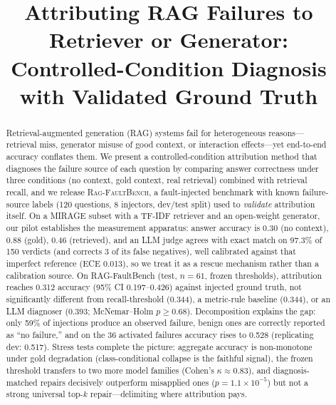 \documentclass[conference]{IEEEtran}
\begin{document}
\title{Attributing RAG Failures to Retriever or Generator:\\
Controlled-Condition Diagnosis with Validated Ground Truth}

\author{
}

\maketitle

\begin{abstract}
Retrieval-augmented generation (RAG) systems fail for heterogeneous
reasons---retrieval miss, generator misuse of good context, or interaction
effects---yet end-to-end accuracy conflates them. We present a
controlled-condition attribution method that diagnoses the failure source of
each question by comparing answer correctness under three conditions (no
context, gold context, real retrieval) combined with retrieval recall, and we
release \textsc{Rag-FaultBench}, a fault-injected benchmark with known
failure-source labels (120 questions, 8 injectors, dev/test split) used to
\emph{validate} attribution itself. On a MIRAGE subset with a TF-IDF retriever
and an open-weight generator, our pilot establishes the measurement apparatus:
answer accuracy is 0.30 (no context), 0.88 (gold), 0.46 (retrieved), and an
LLM judge agrees with exact match on 97.3\% of 150 verdicts (and corrects 3
of its false negatives), well calibrated against that imperfect reference
(ECE 0.013), so we treat it as a rescue mechanism rather than a
calibration source.
On RAG-FaultBench (test, $n{=}61$, frozen thresholds), attribution reaches
0.312 accuracy (95\% CI 0.197--0.426) against injected ground truth, not
significantly different from recall-threshold (0.344), a metric-rule
baseline (0.344), or an LLM diagnoser (0.393; McNemar--Holm $p\ge0.68$).
Decomposition explains the gap: only 59\% of injections produce an
observed failure, benign ones are correctly reported as ``no failure,''
and on the 36 activated failures accuracy rises to 0.528 (replicating dev:
0.517). Stress tests complete the picture: aggregate accuracy is
non-monotone under gold degradation (class-conditional collapse is the
faithful signal), the frozen threshold transfers to two more model
families (Cohen's $\kappa{\approx}0.83$), and diagnosis-matched repairs
decisively outperform misapplied ones ($p{=}1.1{\times}10^{-5}$) but not
a strong universal top-$k$ repair---delimiting where attribution pays.
\end{abstract}
\end{document}
